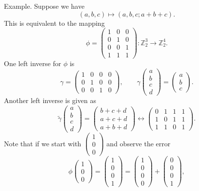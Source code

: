\documentclass[12pt]{article}
\theoremstyle{definition}
\newcommand{\Z}{\mathbb{Z}}
\begin{document}
Example. Suppose we have
\[
(a,b,c) \mapsto (a,b,c;a+b+c).
\]
This is equivalent to the mapping
\[
\phi=\begin{pmatrix}
1 & 0 & 0\\
0 & 1 & 0\\
0 & 0 & 1\\
1 & 1 & 1
\end{pmatrix} : \Z_2^3 \to \Z_2^4.
\]
One left inverse for $\phi$ is
\[
\gamma=\begin{pmatrix}
1 & 0 & 0 & 0\\
0 & 1 & 0 & 0\\
0 & 0 & 1 & 0
\end{pmatrix}, \qquad \gamma\begin{pmatrix}a\\ b\\ c\\ d\end{pmatrix}=\begin{pmatrix}a\\ b\\ c\end{pmatrix}.
\]
Another left inverse is given as
\[
\widetilde{\gamma}\begin{pmatrix}a\\ b\\ c\\ d\end{pmatrix}=\begin{pmatrix}b+c+d\\ a+c+d\\ a+b+d\end{pmatrix} \leftrightarrow \begin{pmatrix}0 & 1 & 1 & 1\\ 1 & 0 & 1 & 1\\ 1 & 1 & 0 & 1\end{pmatrix}.
\]
Note that if we start with $\begin{pmatrix}1\\0\\0\end{pmatrix}$ and observe the error
\[
\phi\begin{pmatrix}1\\0\\0\end{pmatrix}=\begin{pmatrix}1\\0\\0\\1\end{pmatrix}=\begin{pmatrix}1\\0\\0\\0\end{pmatrix}+\begin{pmatrix}0\\0\\0\\1\end{pmatrix},
\]
\end{document}
